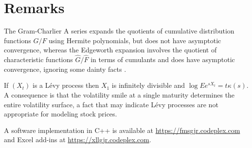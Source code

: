 \documentclass[11pt]{article}
\theoremstyle{definition}
\begin{document}
%

\section{Remarks}
The Gram-Charlier A series expands the quotients of cumulative
distribution functions \(G/F\) using Hermite polynomials, but does not
have asymptotic convergence, whereas the Edgeworth expansion involves
the quotient of characteristic functions \(\hat G/\hat F\) in terms of
cumulants and does have asymptotic convergence, ignoring some dainty
facts \cite{Pet1975}.

If \((X_t)\) is a L\'evy process then \(X_1\) is
infinitely divisible and \(\log Ee^{sX_t} = t\kappa(s)\).
A consequence is that the volatility smile at a single
maturity determines the entire volatility surface, a fact that
may indicate L\'evy processes are not appropriate for
modeling stock prices.

A software implementation in C++ is available at
\url{https://fmsgjr.codeplex.com} and Excel add-ins
at \url{https://xllgjr.codeplex.com}.



\end{document}
